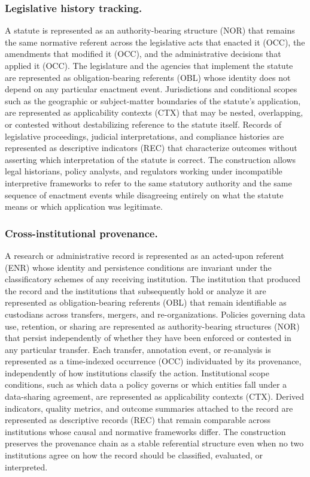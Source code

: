 \subsubsection{Legislative history tracking.}
A statute is represented as an authority-bearing structure (NOR) that
remains the same normative referent across the legislative acts that
enacted it (OCC), the amendments that modified it (OCC), and the
administrative decisions that applied it (OCC).
The legislature and the agencies that implement the statute are
represented as obligation-bearing referents (OBL) whose identity
does not depend on any particular enactment event.
Jurisdictions and conditional scopes such as the geographic or
subject-matter boundaries of the statute's application, are
represented as applicability contexts (CTX) that may be nested,
overlapping, or contested without destabilizing reference to the
statute itself.
Records of legislative proceedings, judicial interpretations, and
compliance histories are represented as descriptive indicators (REC)
that characterize outcomes without asserting which interpretation
of the statute is correct.
The construction allows legal historians, policy analysts, and
regulators working under incompatible interpretive frameworks to
refer to the same statutory authority and the same sequence of
enactment events while disagreeing entirely on what the statute
means or which application was legitimate.

\subsubsection{Cross-institutional provenance.}
A research or administrative record is represented as an
acted-upon referent (ENR) whose identity and persistence conditions
are invariant under the classificatory schemes of any receiving
institution.
The institution that produced the record and the institutions that
subsequently hold or analyze it are represented as obligation-bearing
referents (OBL) that remain identifiable as custodians across
transfers, mergers, and re-organizations.
Policies governing data use, retention, or sharing are represented
as authority-bearing structures (NOR) that persist independently of
whether they have been enforced or contested in any particular transfer.
Each transfer, annotation event, or re-analysis is represented as a
time-indexed occurrence (OCC) individuated by its provenance,
independently of how institutions classify the action.
Institutional scope conditions, such as which data a policy governs
or which entities fall under a data-sharing agreement, are
represented as applicability contexts (CTX).
Derived indicators, quality metrics, and outcome summaries attached
to the record are represented as descriptive records (REC) that remain
comparable across institutions whose causal and normative frameworks
differ.
The construction preserves the provenance chain as a stable referential
structure even when no two institutions agree on how the record should
be classified, evaluated, or interpreted.
